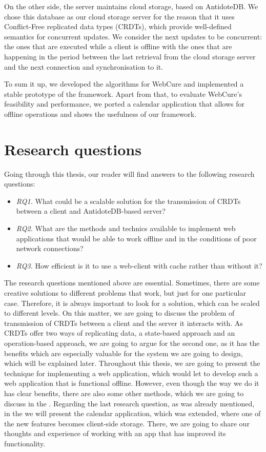 On the other side, the server maintains cloud storage, based on AntidoteDB. We chose this database as our cloud storage server for the reason that it uses Conflict-Free replicated data types (CRDTs), which provide well-defined semantics for concurrent updates. We consider the next updates to be concurrent: the ones that are executed while a client is offline with the ones that are happening in the period between the last retrieval from the cloud storage server and the next connection and synchronisation to it. 

To sum it up, we developed the algorithms for WebCure and implemented a stable prototype of the framework. Apart from that, to evaluate WebCure's feasibility and performance, we ported a calendar application that allows for offline operations and shows the usefulness of our framework.

\section{Research questions}
\label{Introduction-Research}

Going through this thesis, our reader will find answers to the following research questions:

\begin{itemize}
    \item \textit{RQ1.} What could be a scalable solution for the transmission of CRDTs between a client and AntidoteDB-based server?
    \item \textit{RQ2.} What are the methods and technics available to implement web applications that would be able to work offline and
    in the conditions of poor network connections?
    \item \textit{RQ3.} How efficient is it to use a web-client with cache rather than without it?
  \end{itemize}

The research questions mentioned above are essential. Sometimes, there are some creative solutions to different problems that work, but just for one particular case. Therefore, it is always important to look for a solution, which can be scaled to different levels. On this matter, we are going to discuss the problem of transmission of CRDTs between a client and the server it interacts with. As CRDTs offer two ways of replicating data, a state-based approach and an operation-based approach, we are going to argue for the second one, as it has the benefits which are especially valuable for the system we are going to design, which will be explained later. Throughout this thesis, we are going to present the technique for implementing a web application, which would let to develop such a web application that is functional offline. However, even though the way we do it has clear benefits, there are also some other methods, which we are going to discuss in the . Regarding the last research question, as was already mentioned, in the  we will present the calendar application, which was extended, where one of the new features becomes client-side storage. There, we are going to share our thoughts and experience of working with an app that has improved its functionality.

